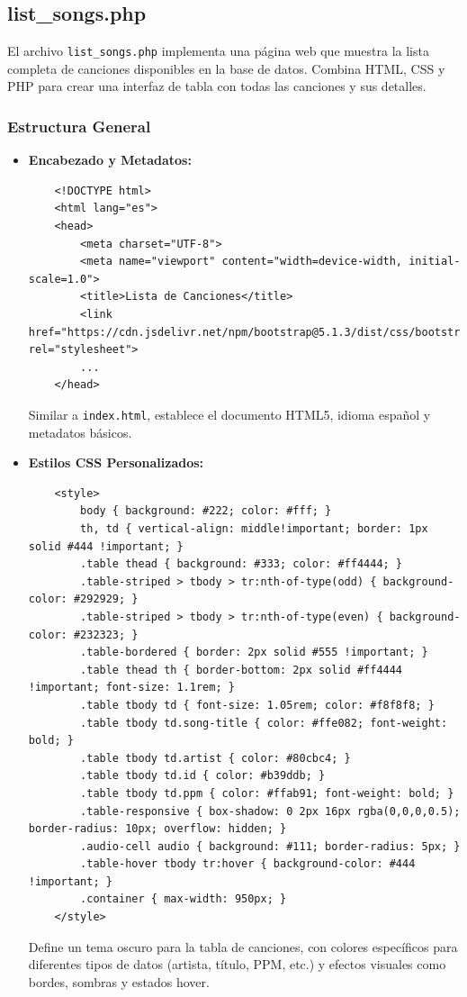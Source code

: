 \documentclass[a4paper,12pt]{article}
\begin{document}
\subsection{list\_songs.php}
El archivo \texttt{list\_songs.php} implementa una página web que muestra la lista completa de canciones disponibles en la base de datos. Combina HTML, CSS y PHP para crear una interfaz de tabla con todas las canciones y sus detalles.

\subsubsection{Estructura General}
\begin{itemize}
    \item \textbf{Encabezado y Metadatos:}
    \begin{verbatim}
    <!DOCTYPE html>
    <html lang="es">
    <head>
        <meta charset="UTF-8">
        <meta name="viewport" content="width=device-width, initial-scale=1.0">
        <title>Lista de Canciones</title>
        <link href="https://cdn.jsdelivr.net/npm/bootstrap@5.1.3/dist/css/bootstrap.min.css" rel="stylesheet">
        ...
    </head>
    \end{verbatim}
    Similar a \texttt{index.html}, establece el documento HTML5, idioma español y metadatos básicos.

    \item \textbf{Estilos CSS Personalizados:}
    \begin{verbatim}
    <style>
        body { background: #222; color: #fff; }
        th, td { vertical-align: middle!important; border: 1px solid #444 !important; }
        .table thead { background: #333; color: #ff4444; }
        .table-striped > tbody > tr:nth-of-type(odd) { background-color: #292929; }
        .table-striped > tbody > tr:nth-of-type(even) { background-color: #232323; }
        .table-bordered { border: 2px solid #555 !important; }
        .table thead th { border-bottom: 2px solid #ff4444 !important; font-size: 1.1rem; }
        .table tbody td { font-size: 1.05rem; color: #f8f8f8; }
        .table tbody td.song-title { color: #ffe082; font-weight: bold; }
        .table tbody td.artist { color: #80cbc4; }
        .table tbody td.id { color: #b39ddb; }
        .table tbody td.ppm { color: #ffab91; font-weight: bold; }
        .table-responsive { box-shadow: 0 2px 16px rgba(0,0,0,0.5); border-radius: 10px; overflow: hidden; }
        .audio-cell audio { background: #111; border-radius: 5px; }
        .table-hover tbody tr:hover { background-color: #444 !important; }
        .container { max-width: 950px; }
    </style>
    \end{verbatim}
    Define un tema oscuro para la tabla de canciones, con colores específicos para diferentes tipos de datos (artista, título, PPM, etc.) y efectos visuales como bordes, sombras y estados hover.
\end{itemize}
\end{document}

